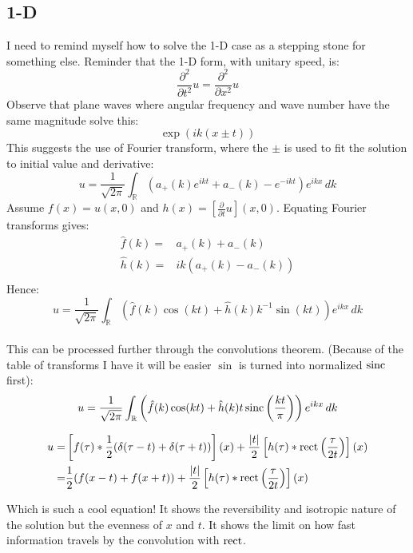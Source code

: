 \subsection{1-D}
I need to remind myself how to solve the 1-D case as a stepping stone for something else.
Reminder that the 1-D form, with unitary speed, is:
\[ \frac{\partial^2}{\partial t^2} u = \frac{\partial^2}{\partial x^2}u\]
Observe that plane waves where angular frequency and wave number have the same magnitude solve this:
\[ \exp(ik(x\pm t))\]
This suggests the use of Fourier transform, where the $\pm$ is used to fit the solution to initial value and derivative:
\[ u = \frac{1}{\sqrt{2\pi}}\int_\mathbb{R}(a_+(k)e^{ikt}+a_-(k)-e^{-ikt})e^{ikx}\,dk\]
Assume $f(x) = u(x,0)$ and $h(x) = \left[\frac{\partial}{\partial t}u\right](x,0)$.
Equating Fourier transforms gives:
\begin{equation*}
\begin{aligned}
	\hat{f}(k) =& a_+(k)+a_-(k) \\
	\hat{h}(k) =& ik(a_+(k)-a_-(k)) \\
\end{aligned}
\end{equation*}
Hence:
\[ u = \frac{1}{\sqrt{2\pi}}\int_\mathbb{R}(\hat{f}(k)\cos(kt)+\hat{h}(k)k^{-1}\sin(kt))e^{ikx}\,dk\]
\\

This can be processed further through the convolutions theorem.
(Because of the table of transforms I have it will be easier $\sin$ is turned into normalized $\operatorname{sinc}$ first):
\[ u = \frac{1}{\sqrt{2\pi}}\int_\mathbb{R}\left(\hat{f}(k)\cos(kt)+\hat{h}(k)t\operatorname{sinc}\left(\frac{kt}{\pi}\right)\right)e^{ikx}\,dk\]

\begin{equation*}
\begin{aligned}
	u =& \left[f(\tau)\ast\frac{1}{2}(\delta(\tau-t)+\delta(\tau+t))\right](x) + \frac{|t|}{2}\left[h(\tau)\ast\operatorname{rect}\left(\frac{\tau}{2t}\right)\right](x)\\
	 =&  \frac{1}{2}(f(x-t)+f(x+t)) + \frac{|t|}{2}\left[h(\tau)\ast\operatorname{rect}\left(\frac{\tau}{2t}\right)\right](x)\\
\end{aligned}
\end{equation*}

Which is such a cool equation!
It shows the reversibility and isotropic nature of the solution but the evenness of $x$ and $t$.
It shows the limit on how fast information travels by the convolution with $\operatorname{rect}$.
